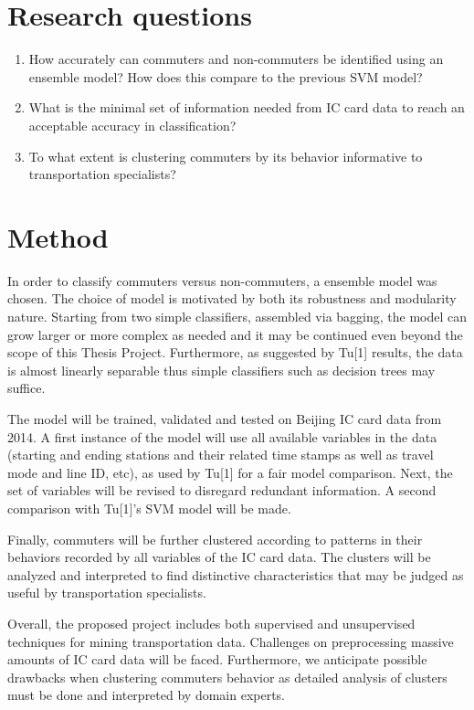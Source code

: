 \documentclass{article}
\begin{document}
\section{Research questions}

\begin{enumerate}
\item How accurately can commuters and non-commuters be identified using an ensemble model? How does this compare to the previous SVM model?
\item What is the minimal set of information needed from IC card data to reach an acceptable accuracy in classification?
\item To what extent is clustering commuters by its behavior informative to transportation specialists? 
\end{enumerate}

\section{Method}
In order to classify commuters versus non-commuters, a ensemble model was chosen. The choice of model is motivated by both its robustness and modularity nature. Starting from two simple classifiers, assembled via bagging, the model can grow larger or more complex as needed and it may be continued even beyond the scope of this Thesis Project. Furthermore, as suggested by Tu[1] results, the data is almost linearly separable thus simple classifiers such as decision trees may suffice. 

The model will be trained, validated and tested on Beijing IC card data from 2014. A first instance of the model will use all available variables in the data (starting and ending stations and their related time stamps as well as travel mode and line ID, etc), as used by Tu[1] for a fair model comparison. Next, the set of variables will be revised to disregard redundant information. A second comparison with Tu[1]'s SVM model will be made. 

Finally, commuters will be further clustered according to patterns in their behaviors recorded by all variables of the IC card data. The clusters will be analyzed and interpreted to find distinctive characteristics that may be judged as useful by transportation specialists. 

Overall, the proposed project includes both supervised and unsupervised techniques for mining transportation data. Challenges on preprocessing massive amounts of IC card data will be faced. Furthermore, we anticipate possible drawbacks when clustering commuters behavior as detailed analysis of clusters must be done and interpreted by domain experts. 
\end{document}

